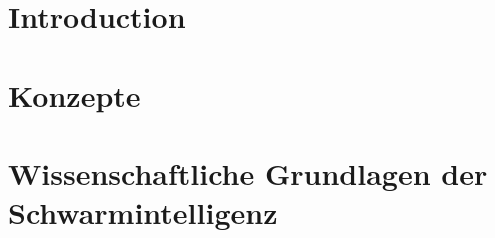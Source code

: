 \documentclass[12pt, a4paper]{report}
\begin{document}

\chapter{Introduction}

\chapter{Konzepte}

\chapter{Wissenschaftliche Grundlagen der Schwarmintelligenz}

\printbibliography
\end{document}
